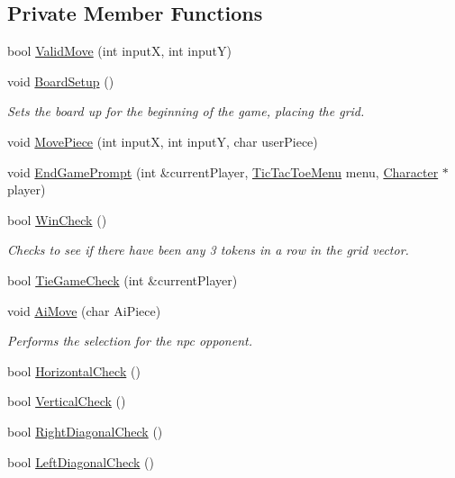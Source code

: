 \subsection*{Private Member Functions}
\begin{DoxyCompactItemize}
\item 
bool \hyperlink{classTicTacToe_ab3e52a3c1bb9fefe08f4c4641f8a70f8}{Valid\-Move} (int input\-X, int input\-Y)
\item 
void \hyperlink{classTicTacToe_a5a03afaffde20d826472e7a8e27995e4}{Board\-Setup} ()
\begin{DoxyCompactList}\small\item\em Sets the board up for the beginning of the game, placing the grid. \end{DoxyCompactList}\item 
void \hyperlink{classTicTacToe_afb236f340525d12a81667a340440b210}{Move\-Piece} (int input\-X, int input\-Y, char user\-Piece)
\item 
void \hyperlink{classTicTacToe_a608d3101cab7340fcc2d0ea5061c37ea}{End\-Game\-Prompt} (int \&current\-Player, \hyperlink{classTicTacToeMenu}{Tic\-Tac\-Toe\-Menu} menu, \hyperlink{classCharacter}{Character} $\ast$player)
\item 
bool \hyperlink{classTicTacToe_afe8f0ecd818f9f6b8418b7e597ff56a7}{Win\-Check} ()
\begin{DoxyCompactList}\small\item\em Checks to see if there have been any 3 tokens in a row in the grid vector. \end{DoxyCompactList}\item 
bool \hyperlink{classTicTacToe_a8134bdddf731a29f61f42273e23f1abf}{Tie\-Game\-Check} (int \&current\-Player)
\item 
void \hyperlink{classTicTacToe_a457647024a551cb3d574d47a9ca85091}{Ai\-Move} (char Ai\-Piece)
\begin{DoxyCompactList}\small\item\em Performs the selection for the npc opponent. \end{DoxyCompactList}\item 
bool \hyperlink{classTicTacToe_afce358eabb849ae0dbf55818a7bdc56b}{Horizontal\-Check} ()
\item 
bool \hyperlink{classTicTacToe_aff214a5737d06961a5f6a14cf97ed1fe}{Vertical\-Check} ()
\item 
bool \hyperlink{classTicTacToe_a3b96d4252e042b2e85bb0bc9a501bc0c}{Right\-Diagonal\-Check} ()
\item 
bool \hyperlink{classTicTacToe_ad65a6d8382d7a59c68a6778caea91d78}{Left\-Diagonal\-Check} ()

\end{DoxyCompactItemize}
